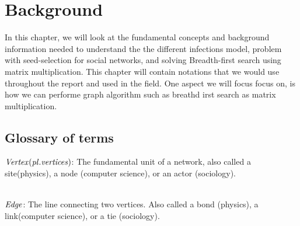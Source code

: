 \chapter{Background}

In this chapter, we will look at the fundamental concepts and background information needed to understand the the different infections model, problem with seed-selection for social networks, and solving Breadth-first search using matrix multiplication. This chapter will contain notations that we would use throughout the report and used in the field. One aspect we will focus focus on, is how we can performe graph algorithm such as breathd irst search as matrix multiplication.

\section{Glossary of terms}
    	$\it{{Vertex}} (pl. vertices)$: The fundamental unit of a network, also called a site(physics), a node (computer science), or an actor 	(sociology).
    	
    	\\

		$\it{{Edge}}$: The line connecting two vertices. Also called a bond (physics), a link(computer science), or a tie (sociology).

